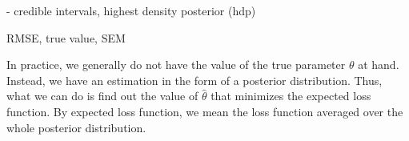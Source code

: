 - credible intervals, highest density posterior (hdp) 


RMSE, true value, SEM 

In practice, we generally do not have the value of the true parameter $\theta$ at hand. Instead, we have an estimation in the form of a posterior distribution. Thus, what we can do is find out the value of $\hat{\theta}$ that minimizes the expected loss function. By expected loss function, we mean the loss function averaged over the whole posterior distribution. 









